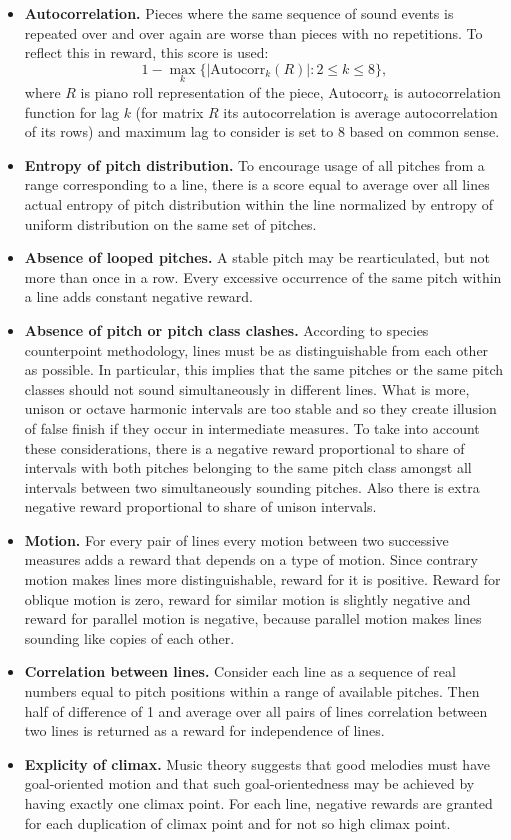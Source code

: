 \documentclass{article}
\begin{document}
\begin{itemize}
	\item \textbf{Autocorrelation.} Pieces where the same sequence of sound events is repeated over and over again are worse than pieces with no repetitions. To reflect this in reward, this score is used:
	$$1 - \max_k \{|\mathrm{Autocorr}_k(R)| : 2 \le k \le 8\},$$
	where $R$ is piano roll representation of the piece, $\mathrm{Autocorr}_k$ is autocorrelation function for lag $k$ (for matrix $R$ its autocorrelation is average autocorrelation of its rows) and maximum lag to consider is set to 8 based on common sense.
	\item \textbf{Entropy of pitch distribution.} To encourage usage of all pitches from a range corresponding to a line, there is a score equal to average over all lines actual entropy of pitch distribution within the line normalized by entropy of uniform distribution on the same set of pitches.
	\item \textbf{Absence of looped pitches.} A stable pitch may be rearticulated, but not more than once in a row. Every excessive occurrence of the same pitch within a line adds constant negative reward.
	\item \textbf{Absence of pitch or pitch class clashes.} According to species counterpoint methodology, lines must be as distinguishable from each other as possible. In particular, this implies that the same pitches or the same pitch classes should not sound simultaneously in different lines. What is more, unison or octave harmonic intervals are too stable and so they create illusion of false finish if they occur in intermediate measures. To take into account these considerations, there is a negative reward proportional to share of intervals with both pitches belonging to the same pitch class amongst all intervals between two simultaneously sounding pitches. Also there is extra negative reward proportional to share of unison intervals.
	\item \textbf{Motion.} For every pair of lines every motion between two successive measures adds a reward that depends on a type of motion. Since contrary motion makes lines more distinguishable, reward for it is positive. Reward for oblique motion is zero, reward for similar motion is slightly negative and reward for parallel motion is negative, because parallel motion makes lines sounding like copies of each other.
	\item \textbf{Correlation between lines.} Consider each line as a sequence of real numbers equal to pitch positions within a range of available pitches. Then half of difference of 1 and average over all pairs of lines correlation between two lines is returned as a reward for independence of lines. 
    \item \textbf{Explicity of climax.} Music theory suggests that good melodies must have goal-oriented motion and that such goal-orientedness may be achieved by having exactly one climax point. For each line, negative rewards are granted for each duplication of climax point and for not so high climax point. 
\end{itemize}
\end{document}
